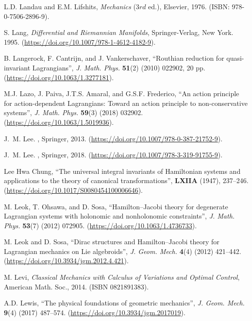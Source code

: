 \documentclass[12pt]{report}
\begin{document}
\begin{thebibliography}{999}
L.D. Landau and E.M. Lifshits,
{\it Mechanics} ($3rd$ ed.), Elsevier, 1976.
(ISBN: 978-0-7506-2896-9).

S. Lang,
{\it Differential and Riemannian Manifolds},
Springer-Verlag, New York. 1995.
(\url{https://doi.org/10.1007/978-1-4612-4182-9}).

{\rm B. Langerock, F. Cantrijn, and J. Vankerschaver},
``Routhian reduction for quasi-invariant Lagrangians'',
{\sl J. Math. Phys.} {\bf 51}(2) (2010) 022902, 20 pp.
(\url{https://doi.org/10.1063/1.3277181}).

M.J. Lazo, J. Paiva, J.T.S. Amaral, and G.S.F. Frederico, 
``An action principle for action-dependent Lagrangians: Toward an action principle to non-conservative systems'',
{\sl J. Math. Phys.} {\bf 59}(3) (2018) 032902. 
(\url{https://doi.org/10.1063/1.5019936}).

J.~M. Lee.
,
\newblock Springer, 2013.
(\url{https://doi.org/10.1007/978-0-387-21752-9}).

J.~M. Lee.
,
\newblock Springer, 2018.
(\url{https://doi.org/10.1007/978-3-319-91755-9}).

Lee Hwa Chung,
\newblock ``The universal integral invariants of Hamiltonian systems and applications to the theory of canonical transformations'',
 \textbf{LXIIA} (1947), 237--246.
(\url{https://doi.org/10.1017/S0080454100006646}).

M. Leok, T. Ohsawa, and D. Sosa,
``Hamilton--Jacobi theory for degenerate Lagrangian systems with holonomic and nonholonomic constraints'',
{\sl J. Math. Phys.} {\bf 53}(7) (2012) 072905. 
(\url{https://doi.org/10.1063/1.4736733}).

M. Leok and D. Sosa,
``Dirac structures and Hamilton--Jacobi theory for Lagrangian mechanics on Lie algebroids'',
{\sl J. Geom. Mech.} {\bf 4}(4) (2012) 421--442.
(\url{https://doi.org/10.3934/jgm.2012.4.421}).

M. Levi,
{\it Classical Mechanics with Calculus of Variations and Optimal Control},
American Math. Soc., 2014.
(ISBN 0821891383).

A.D. Lewis,
``The physical foundations of geometric mechanics'',
{\sl J. Geom. Mech.} {\bf 9}(4) (2017) 487--574.
(\url{https://doi.org/10.3934/jgm.2017019}).


\end{thebibliography}
\end{document}
